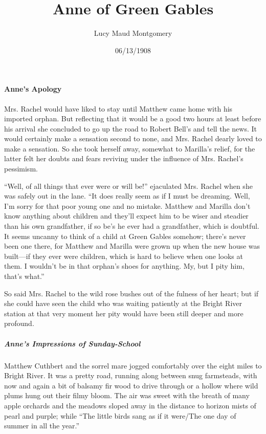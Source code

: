 \documentclass{article}
\title{Anne of Green Gables}
\author{Lucy Maud Montgomery}
\date{06/13/1908}
\begin{document}
\maketitle

\paragraph{Anne's Apology}
Mrs. Rachel would have liked to stay until Matthew came home with his imported orphan. But reflecting that it would be a good two hours at least before his arrival she concluded to go up the road to Robert Bell's and tell the news. It would certainly make a sensation second to none, and Mrs. Rachel dearly loved to make a sensation. So she took herself away, somewhat to Marilla's relief, for the latter felt her doubts and fears reviving under the influence of Mrs. Rachel's pessimism.

``Well, of all things that ever were or will be!'' ejaculated Mrs. Rachel when she was safely out in the lane. ``It does really seem as if I must be dreaming. Well, I'm sorry for that poor young one and no mistake. Matthew and Marilla don't know anything about children and they'll expect him to be wiser and steadier than his own grandfather, if so be's he ever had a grandfather, which is doubtful. It seems uncanny to think of a child at Green Gables somehow; there's never been one there, for Matthew and Marilla were grown up when the new house was built---if they ever were children, which is hard to believe when one looks at them. I wouldn't be in that orphan's shoes for anything. My, but I pity him, that's what.''

So said Mrs. Rachel to the wild rose bushes out of the fulness of her heart; but if she could have seen the child who was waiting patiently at the Bright River station at that very moment her pity would have been still deeper and more profound.

\subparagraph{Anne's Impressions of Sunday-School}
Matthew Cuthbert and the sorrel mare jogged comfortably over the eight miles to Bright River. It was a pretty road, running along between snug farmsteads, with now and again a bit of balsamy fir wood to drive through or a hollow where wild plums hung out their filmy bloom. The air was sweet with the breath of many apple orchards and the meadows sloped away in the distance to horizon mists of pearl and purple; while ``The little birds sang as if it were/The one day of summer in all the year.''
\end{document}
